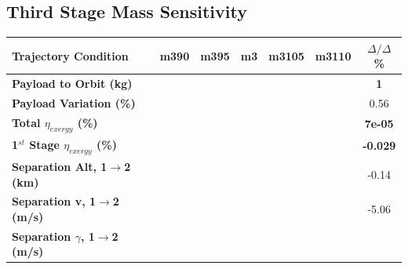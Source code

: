\subsection{Third Stage Mass Sensitivity}

\begin{table}[ht]
	\centering
	\begin{tabular}{l c c c c c c} 
		\hline \textbf{Trajectory Condition}
		&m390
		&m395
		&m3
		&m3105
		&m3110
		& $\Delta/\Delta$\%
		\\
		\hline \textbf{Payload to Orbit (kg)}
		& \textbf{\PayloadToOrbitmThreeNinety}
		& \textbf{\PayloadToOrbitmThreeNinetyFive}
		& \textbf{\PayloadToOrbitmThreeStandard}
		& \textbf{\PayloadToOrbitmThreeOneHundredFive}
		& \textbf{\PayloadToOrbitmThreeOneHundredTen}
		&\textbf{1}
		\\
		\textbf{Payload Variation (\%)}
		& \PayloadVarmThreeNinety
		& \PayloadVarmThreeNinetyFive
		& \PayloadVarmThreeStandard
		& \PayloadVarmThreeOneHundredFive
		& \PayloadVarmThreeOneHundredTen
		&0.56
		\\
		\textbf{Total $\eta_{exergy}$ (\%)}
		& \textbf{\totalExergyEffmThreeNinety}
		& \textbf{\totalExergyEffmThreeNinetyFive}
		& \textbf{\totalExergyEffmThreeStandard}
		& \textbf{\totalExergyEffmThreeOneHundredFive}
		& \textbf{\totalExergyEffmThreeOneHundredTen}
		& \textbf{7e-05}
		\\
		\hline 
		\textbf{1$^{st}$ Stage $\eta_{exergy}$ (\%)}
		& \textbf{\firstExergyEffmThreeNinety}
		& \textbf{\firstExergyEffmThreeNinetyFive}
		& \textbf{\firstExergyEffmThreeStandard}
		& \textbf{\firstExergyEffmThreeOneHundredFive}
		& \textbf{\firstExergyEffmThreeOneHundredTen}
		& \textbf{-0.029}
		\\
		\textbf{Separation Alt, 1$\rightarrow$2 (km)}
		& \firstsecondSeparationAltmThreeNinety
		& \firstsecondSeparationAltmThreeNinetyFive
		& \firstsecondSeparationAltmThreeStandard
		& \firstsecondSeparationAltmThreeOneHundredFive
		& \firstsecondSeparationAltmThreeOneHundredTen
		&-0.14
		\\
		\textbf{Separation v, 1$\rightarrow$2 (m/s)}
		& \firstsecondSeparationvmThreeNinety
		& \firstsecondSeparationvmThreeNinetyFive
		& \firstsecondSeparationvmThreeStandard
		& \firstsecondSeparationvmThreeOneHundredFive
		& \firstsecondSeparationvmThreeOneHundredTen
		&-5.06
		\\
		\textbf{Separation $\gamma$, 1$\rightarrow$2 (m/s)}
		& \firstsecondSeparationgammamThreeNinety
		& \firstsecondSeparationgammamThreeNinetyFive
		& \firstsecondSeparationgammamThreeStandard

\end{tabular}
\end{table}
